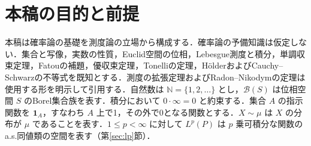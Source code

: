 \documentclass[a5paper,10pt,onecolumn]{jsarticle}
\theoremstyle{mathnotetheorem}
\newcommand{\N}{\mathbb{N}}
\newcommand{\1}{\mathbf{1}}
\begin{document}
\section{本稿の目的と前提}
本稿は確率論の基礎を測度論の立場から構成する．確率論の予備知識は仮定しない．集合と写像，実数の性質，Euclid空間の位相，Lebesgue測度と積分，単調収束定理，Fatouの補題，優収束定理，Tonelliの定理，H\"olderおよびCauchy--Schwarzの不等式を既知とする．測度の拡張定理およびRadon--Nikodymの定理は使用する形を明示して引用する．自然数は $\N=\{1,2,\ldots\}$ とし，$\mathcal B(S)$ は位相空間 $S$ のBorel集合族を表す．積分において $0\cdot\infty=0$ と約束する．集合 $A$ の指示関数を $\1_A$，すなわち $A$ 上で1，その外で0となる関数とする．$X\sim\mu$ は $X$ の分布が $\mu$ であることを表す．$1\le p<\infty$ に対して $L^p(P)$ は $p$ 乗可積分な関数のa.s.同値類の空間を表す（第\ref{sec:lp}節）．
\end{document}
